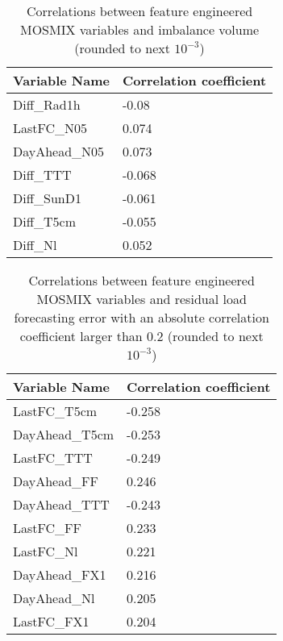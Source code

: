 \documentclass[class=scrbook, crop=false]{standalone}
\begin{document}
    \begin{table}
    \centering
    \begin{tabular}{l|l}
    Variable Name	& Correlation coefficient \\\hline
	Diff\_Rad1h                          &-0.08\\
	LastFC\_N05                          &0.074\\
	DayAhead\_N05                        &0.073\\
	Diff\_TTT                           &-0.068\\
	Diff\_SunD1                         &-0.061\\
	Diff\_T5cm                          &-0.055\\
	Diff\_Nl                             &0.052\\
    \end{tabular}
    
    \caption{Correlations between feature engineered MOSMIX variables and imbalance volume (rounded to next $10^{-3}$)}
    \label{Table::imbalance_volume_MOSMIX_correlations}
    \end{table}
    
    
    \begin{table}
    \centering
    \begin{tabular}{l|l}
    Variable Name	& Correlation coefficient \\\hline
	LastFC\_T5cm                        &-0.258\\
	DayAhead\_T5cm                      &-0.253\\
	LastFC\_TTT                         &-0.249\\
	DayAhead\_FF                         &0.246\\
	DayAhead\_TTT                       &-0.243\\
	LastFC\_FF                           &0.233\\
	LastFC\_Nl                           &0.221\\
	DayAhead\_FX1                        &0.216\\
	DayAhead\_Nl                         &0.205\\
	LastFC\_FX1                          &0.204\\
    \end{tabular}
    
    \caption{Correlations between feature engineered MOSMIX variables and residual load forecasting error with an absolute correlation coefficient larger than $0.2$ (rounded to next $10^{-3}$)}
    \label{Table::residual_load_fce_MOSMIX_correlations}
    \end{table}
\end{document}
